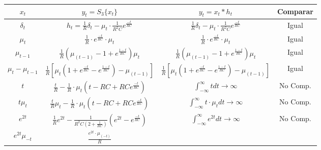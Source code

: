 \documentclass[12pt,a4paper]{report}
\begin{document}
\begin{enumerate}[label=\alph*)]
      \begin{table}[h!]
        \centering
        \begin{tabular}{|c|c|c|c|}
          \hline
          \textbf{$x_t$} & \textbf{$y_t = S_3\{x_t\}$} & \textbf{$y_t = x_t * h_t$} & \textbf{Comparar}\\
          \hline
            $\delta_t$ & $h_t = \frac{1}{R} \delta_t - \mu_t \cdot \frac{1}{R^2C} e^{\frac{-t}{RC}}$
                     & $\frac{1}{R} \delta_t - \mu_t \cdot \frac{1}{R^2C} e^{\frac{-t}{RC}}$
                     & Igual\\
          \hline
            $\mu_t$ & $\frac{1}{R} \cdot e^{\frac{-t}{RC}} \cdot \mu_t$
                  & $\frac{1}{R} \cdot e^{\frac{-t}{RC}} \cdot \mu_t$
                  & Igual\\
          \hline
            $\mu_{t-1}$ & $\frac{1}{R}\left(\mu_{(t-1)} - 1 + e^{\frac{1-t}{RC}}\right) \mu_t$
                      & $\frac{1}{R}\left(\mu_{(t-1)} - 1 + e^{\frac{1-t}{RC}}\right) \mu_t$
                      & Igual\\
          \hline
            $\mu_t - \mu_{t-1}$ & $\frac{1}{R} \left[\mu_t \left(1 + e^{\frac{-t}{RC}} - e^{\frac{1-t}{RC}}\right) -
            \mu_{(t-1)} \right]$
                              & $\frac{1}{R} \left[\mu_t \left(1 + e^{\frac{-t}{RC}} - e^{\frac{1-t}{RC}}\right) -
            \mu_{(t-1)} \right]$
                              & Igual\\
          \hline
            $t$ & $\frac{t}{R} - \frac{1}{R} \cdot \mu_t \left(t - RC + RC e^{\frac{-t}{RC}} \right)$
                & $\int_{-\infty}^{\infty} t dt \rightarrow \infty$
                & No Comp.\\
          \hline
            $t\mu_{t}$ & $\frac{t}{R} \mu_t - \frac{1}{R} \cdot \mu_t \left(t - RC + RC e^{\frac{-t}{RC}} \right)$
                       & $\int_{-\infty}^{\infty} t \cdot \mu_t dt \rightarrow \infty$
                       & No Comp.\\
          \hline
            $e^{2t}$ & $\frac{1}{R} e^{2t} - \frac{1}{R^2C\left(2+\frac{1}{RC}\right)}\left(e^{2t} -
              e^{\frac{-t}{RC}}\right)$
                     & $\int_{-\infty}^{\infty} e^{2t} dt \rightarrow \infty$
                     & No Comp.\\
          \hline
              $e^{2t}\mu_{-t}$ & $\frac{e^{2t} \cdot \mu_(-t)}{R}$
                             & 
                             &\\
          \hline


\end{tabular}
\end{table}
\end{enumerate}
\end{document}
